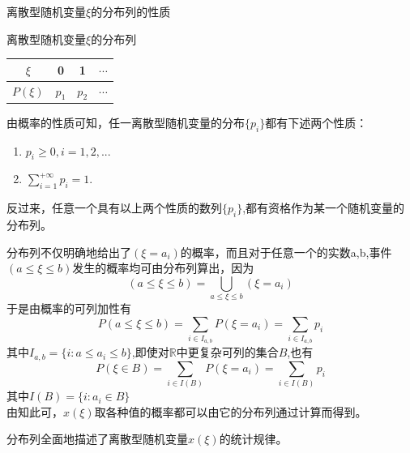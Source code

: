 \documentclass[xcolor=svgnames,serif,table,10pt]{beamer}
\begin{document}
\begin{frame}{离散型随机变量$\xi$的分布列的性质}
\begin{block}{离散型随机变量$\xi$的分布列}
	\begin{tabular}{|c|c|c|c|}
		\hline 
		$\xi$ & 0 & 1 & $\cdots$\\ 
		\hline 
		$P(\xi)$ & $p_1$ & $p_2$ & $\cdots$\\ 
		\hline 
	\end{tabular} 
\end{block}

由概率的性质可知，任一离散型随机变量的分布$\{p_i\}$都有下述两个性质：
\begin{enumerate}
	\item $p_i\ge 0,i=1,2,...$
	\item $\sum_{i=1}^{+\infty}{p_i}=1$.
\end{enumerate}
反过来，任意一个具有以上两个性质的数列$\{p_i\}$,都有资格作为某一个随机变量的分布列。
\end{frame}

\begin{frame}
分布列不仅明确地给出了$(\xi=a_i)$的概率，而且对于任意一个的实数a,b,事件$(a\le\xi\le b)$发生的概率均可由分布列算出，因为
\[(a\le\xi\le b)=\bigcup_{a\le\xi\le b}(\xi=a_i)\]
于是由概率的可列加性有
\[P(a\le\xi\le b)=\sum_{i\in I_{a,b}}P(\xi=a_i)=\sum_{i\in I_{a,b}}p_i\]
其中$I_{a,b}=\{i:a\le a_i\le b\}$,即使对$\mathbb{R}$中更复杂可列的集合$B$,也有
\[P(\xi\in B)=\sum_{i\in I(B)}P(\xi=a_i)=\sum_{i\in I(B)}p_i\]
其中$I(B)=\{i:a_i\in B\}$\\
由知此可，$x(\xi)$取各种值的概率都可以由它的分布列通过计算而得到。
\begin{block}{}
	分布列全面地描述了离散型随机变量$x(\xi)$的统计规律。
\end{block}
\end{frame}
\end{document}
